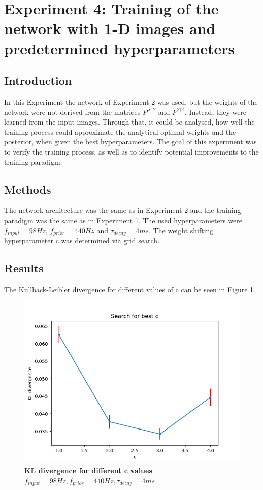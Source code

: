 \section{Experiment 4: Training of the network with 1-D images and predetermined hyperparameters}
\label{section:1DPreDetermined}

\subsection{Introduction}

In this Experiment the network of Experiment 2 was used, but the weights of the network were not derived from the matrices $P^{X|Y}$ and $P^{Y|Z}$. Instead, they were learned from the input images. Through that, it could be analysed, how well the training process could approximate the analytical optimal weights and the posterior, when given the best hyperparameters. The goal of this experiment was to verify the training process, as well as to identify potential improvements to the training paradigm.

\subsection{Methods}

The network architecture was the same as in Experiment 2 and the training paradigm was the same as in Experiment 1. The used hyperparameters were $f_{input} = 98 Hz$, $f_{prior} = 440 Hz$ and $\tau_{decay} = 4 ms$. The weight shifting hyperparameter c was determined via grid search.
\subsection{Results}

The Kullback-Leibler divergence for different values of c can be seen in Figure \ref{fig:1DTrainingC}.
\begin{figure}
\centering
  \includegraphics[width=0.75\linewidth]{figures/1D/training/KLD_cvsfInput98_fPrior440tau4.png}
  \caption{\textbf{KL divergence for different c values} $f_{input} = 98 Hz, f_{prior} = 440 Hz, \tau_{decay} = 4 ms$}
  \label{fig:1DTrainingC}
\end{figure}

